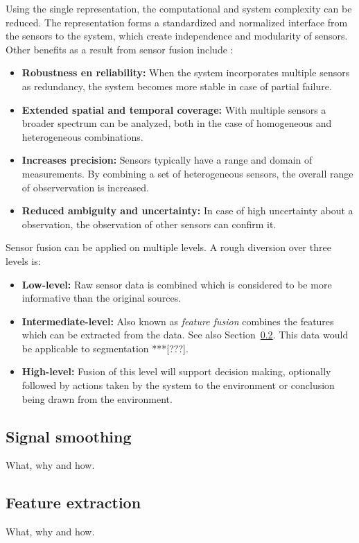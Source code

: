     Using the single representation, the computational and system complexity can be reduced.
    The representation forms a standardized and normalized interface from the sensors to the system, which create independence and modularity of sensors.
    Other benefits as a result from sensor fusion include \cite{elmenreich2001introduction}:
    \begin{itemize}
      \item \textbf{Robustness en reliability:} When the system incorporates multiple sensors as redundancy, the system becomes more stable in case of partial failure.
      \item \textbf{Extended spatial and temporal coverage:} With multiple sensors a broader spectrum can be analyzed, both in the case of homogeneous and heterogeneous combinations.
      \item \textbf{Increases precision:} Sensors typically have a range and domain of measurements.
      By combining a set of heterogeneous sensors, the overall range of observervation is increased.
      \item \textbf{Reduced ambiguity and uncertainty:} In case of high uncertainty about a observation, the observation of other sensors can confirm it.
    \end{itemize}

    Sensor fusion can be applied on multiple levels. A rough diversion over three levels is:
    \begin{itemize}
      \item \textbf{Low-level:} Raw sensor data is combined which is considered to be more informative than the original sources.
      \item \textbf{Intermediate-level:} Also known as \emph{feature fusion} combines the features which can be extracted from the data.
      See also Section~\ref{sec:feature_extraction}.
      This data would be applicable to segmentation ***[???].
      \item \textbf{High-level:} Fusion of this level will support decision making, optionally followed by actions taken by the system to the environment or conclusion being drawn from the environment.
    \end{itemize}


    \subsection{Signal smoothing}
    What, why and how.

    \subsection{Feature extraction}
    \label{sec:feature_extraction}
    What, why and how.